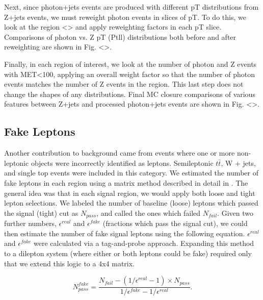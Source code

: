 Next, since photon+jets events are produced with different pT distributions from Z+jets events, we must reweight photon events in slices of pT. To do this, we look at the region <> and apply reweighting factors in each pT slice. Comparisons of photon vs. Z pT (Ptll) distributions both before and after reweighting are shown in Fig. <>.

Finally, in each region of interest, we look at the number of photon and Z events with MET<100, applying an overall weight factor so that the number of photon events matches the number of Z events in the region. This last step does not change the shapes of any distributions. Final MC closure comparisons of various features between Z+jets and processed photon+jets events are shown in Fig. <>.

\subsection*{Fake Leptons}

Another contribution to background came from events where one or more non-leptonic objects were incorrectly identified as leptons. Semileptonic $t\bar{t}$, W + jets, and single top events were included in this category. We estimated the number of fake leptons in each region using a matrix method described in detail in \cite{fake_method}. The general idea was that in each signal region, we would apply both loose and tight lepton selections. We labeled the number of baseline (loose) leptons which passed the signal (tight) cut as $N_{pass}$, and called the ones which failed $N_{fail}$. Given two further numbers, $\epsilon^{real}$ and $\epsilon^{fake}$ (fractions which pass the signal cut), we could then estimate the number of fake signal leptons using the following equation. $\epsilon^{real}$ and $\epsilon^{fake}$ were calculated via a tag-and-probe approach. Expanding this method to a dilepton system (where either or both leptons could be fake) required only that we extend this logic to a 4x4 matrix.

\begin{equation}
N_{pass}^{fake} = \frac{N_{fail}-(1/\epsilon^{real}-1)\times N_{pass}}{1/\epsilon^{fake}-1/\epsilon^{real}}.
\end{equation}


